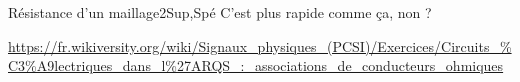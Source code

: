 \begin{exercise}{Résistance d'un maillage}{2}{Sup,Spé}
C'est plus rapide comme ça, non ?


\end{exercise}

\begin{solution}
    \url{https://fr.wikiversity.org/wiki/Signaux\_physiques\_(PCSI)/Exercices/Circuits\_\%C3\%A9lectriques\_dans\_l\%27ARQS\_:\_associations\_de\_conducteurs\_ohmiques}
\end{solution}